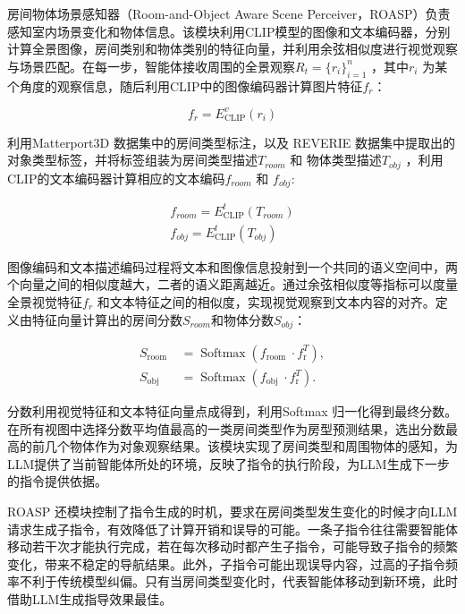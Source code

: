 \documentclass[bachelor]{thesis-uestc}
\begin{document}
房间物体场景感知器（Room-and-Object Aware Scene Perceiver，ROASP）负责感知室内场景变化和物体信息。该模块利用CLIP模型\cite{radford2021learning}的图像和文本编码器，分别计算全景图像，房间类别和物体类别的特征向量，并利用余弦相似度进行视觉观察与场景匹配。在每一步，智能体接收周围的全景观察$R_t = \{r_i\}_{i=1}^n$ ，其中$r_i$ 为某个角度的观察信息，随后利用CLIP中的图像编码器计算图片特征$f_r$：

\begin{equation}
    f_r = E^{v}_{\text{CLIP}}(r_i)
\label{fr}
\end{equation}

利用Matterport3D 数据集中的房间类型标注，以及 REVERIE 数据集中提取出的对象类型标签，并将标签组装为房间类型描述$T_{room}$ 和 物体类型描述$T_{obj}$ ，利用CLIP的文本编码器计算相应的文本编码$f_{room}$ 和 $f_{obj}$:

\begin{equation}
    \begin{aligned}
        f_{room} = E^{t}_{\text{CLIP}}(T_{room})\\
        f_{obj} = E^{t}_{\text{CLIP}}(T_{obj})
    \end{aligned}
\label{fobj}
\end{equation}

图像编码和文本描述编码过程将文本和图像信息投射到一个共同的语义空间中，两个向量之间的相似度越大，二者的语义距离越近。通过余弦相似度等指标可以度量全景视觉特征$f_r$ 和文本特征之间的相似度，实现视觉观察到文本内容的对齐。定义由特征向量计算出的房间分数$S_{room}$和物体分数$S_{obj}$：

\begin{equation}
    \begin{aligned}
        S_{\text {room }} & =\operatorname{Softmax}\left(f_{\text {room }} \cdot f_{\mathrm{r}}^{T}\right), \\
        S_{\text {obj }} & =\operatorname{Softmax}\left(f_{\text {obj }} \cdot f_{\mathrm{r}}^{T}\right) .
        \end{aligned}
\label{s}
\end{equation}

分数利用视觉特征和文本特征向量点成得到，利用Softmax 归一化得到最终分数。在所有视图中选择分数平均值最高的一类房间类型作为房型预测结果，选出分数最高的前几个物体作为对象观察结果。该模块实现了房间类型和周围物体的感知，为LLM提供了当前智能体所处的环境，反映了指令的执行阶段，为LLM生成下一步的指令提供依据。

ROASP 还模块控制了指令生成的时机，要求在房间类型发生变化的时候才向LLM请求生成子指令，有效降低了计算开销和误导的可能。一条子指令往往需要智能体移动若干次才能执行完成，若在每次移动时都产生子指令，可能导致子指令的频繁变化，带来不稳定的导航结果。此外，子指令可能出现误导内容，过高的子指令频率不利于传统模型纠偏。只有当房间类型变化时，代表智能体移动到新环境，此时借助LLM生成指导效果最佳。
\end{document}

